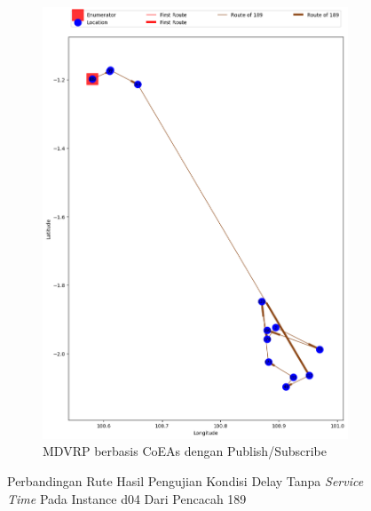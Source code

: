 \begin{figure}[H]\ContinuedFloat
	\centering
	\begin{subfigure}[t]{\textwidth}
		\centering
		\includegraphics[width=\textwidth]{Resources/Images/delayed_5/real_m15_n100_delayed_5_189_pubsub_coes}
		\caption{MDVRP berbasis CoEAs dengan Publish/Subscribe}
		\label{fig:real_m15_n100_delayed_5_189_pubsub_coes}
	\end{subfigure}
	\caption{Perbandingan Rute Hasil Pengujian Kondisi Delay Tanpa \textit{Service Time} Pada Instance d04 Dari Pencacah 189}
	\label{fig:real_m15_n100_delayed_5_189_contd}
\end{figure}


